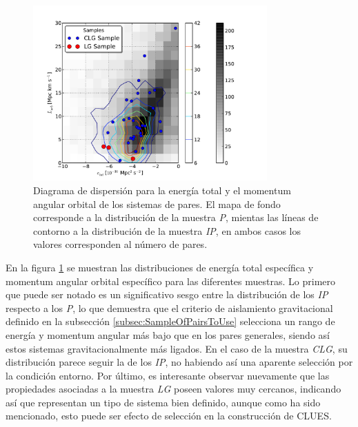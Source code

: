 \begin{figure}[htbp]
	\centering
	\includegraphics[trim = 8mm 0mm 25mm 10mm, clip, width=0.8\textwidth]
	{./figures/4_results/CLG_E_vs_L.pdf}
	
	\caption{\small{Diagrama de dispersión para la energía total y el 
	momentum angular orbital de los sistemas de pares. El mapa de fondo
	corresponde a la distribución de la muestra \textit{P}, mientas las
	líneas de contorno a la distribución de la muestra \textit{IP}, en 
	ambos casos los valores corresponden al número de pares. }}
	\label{fig:CLG_E-L}
\end{figure}


En la figura \ref{fig:CLG_E-L} se muestran las distribuciones de energía 
total específica y momentum angular orbital específico para las diferentes 
muestras. Lo primero que puede ser notado es un significativo sesgo entre
la distribución de los \textit{IP} respecto a los \textit{P}, lo que 
demuestra que el criterio de aislamiento gravitacional definido en la 
subsección \ref{subsec:SampleOfPairsToUse} selecciona un rango de energía 
y momentum angular más bajo que en los pares generales, siendo así estos 
sistemas gravitacionalmente más ligados. En el caso de la muestra 
\textit{CLG}, su distribución parece seguir la de los \textit{IP},
no habiendo así una aparente selección por la condición entorno. Por último,
es interesante observar nuevamente que las propiedades asociadas a la
muestra \textit{LG} poseen valores muy cercanos, indicando así que
representan un tipo de sistema bien definido, aunque como ha sido mencionado,
esto puede ser efecto de selección en la construcción de CLUES.

